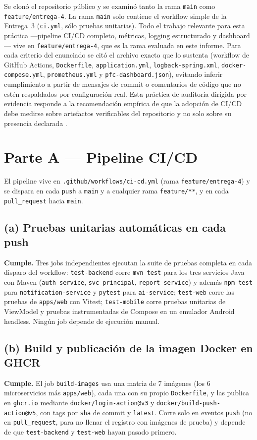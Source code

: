 \documentclass[11pt,letterpaper]{article}
\begin{document}
Se clonó el repositorio público y se examinó tanto la rama \texttt{main} como \texttt{feature/entrega-4}. La rama \texttt{main} solo contiene el workflow simple de la Entrega~3 (\texttt{ci.yml}, sólo pruebas unitarias). Todo el trabajo relevante para esta práctica —pipeline CI/CD completo, métricas, logging estructurado y dashboard— vive en \texttt{feature/entrega-4}, que es la rama evaluada en este informe. Para cada criterio del enunciado se citó el archivo exacto que lo sustenta (workflow de GitHub Actions, \texttt{Dockerfile}, \texttt{application.yml}, \texttt{logback-spring.xml}, \texttt{docker-compose.yml}, \texttt{prometheus.yml} y \texttt{pfc-dashboard.json}), evitando inferir cumplimiento a partir de mensajes de commit o comentarios de código que no estén respaldados por configuración real. Esta práctica de auditoría dirigida por evidencia responde a la recomendación empírica de que la adopción de CI/CD debe medirse sobre artefactos verificables del repositorio y no solo sobre su presencia declarada \cite{fairbanks2023cicd}.

\section{Parte A --- Pipeline CI/CD}

El pipeline vive en \texttt{.github/workflows/ci-cd.yml} (rama \texttt{feature/entrega-4}) y se dispara en cada \texttt{push} a \texttt{main} y a cualquier rama \texttt{feature/**}, y en cada \texttt{pull\_request} hacia \texttt{main}.

\subsection{(a) Pruebas unitarias automáticas en cada push}
\textbf{Cumple.} Tres jobs independientes ejecutan la suite de pruebas completa en cada disparo del workflow: \texttt{test-backend} corre \texttt{mvn test} para los tres servicios Java con Maven (\texttt{auth-service}, \texttt{svc-principal}, \texttt{report-service}) y además \texttt{npm test} para \texttt{notification-service} y \texttt{pytest} para \texttt{ai-service}; \texttt{test-web} corre las pruebas de \texttt{apps/web} con Vitest; \texttt{test-mobile} corre pruebas unitarias de ViewModel y pruebas instrumentadas de Compose en un emulador Android headless. Ningún job depende de ejecución manual.

\subsection{(b) Build y publicación de la imagen Docker en GHCR}
\textbf{Cumple.} El job \texttt{build-images} usa una matriz de 7 imágenes (los 6 microservicios más \texttt{apps/web}), cada una con su propio \texttt{Dockerfile}, y las publica en \texttt{ghcr.io} mediante \texttt{docker/login-action@v3} y \texttt{docker/build-push-action@v5}, con tags por \texttt{sha} de commit y \texttt{latest}. Corre solo en eventos \texttt{push} (no en \texttt{pull\_request}, para no llenar el registro con imágenes de prueba) y depende de que \texttt{test-backend} y \texttt{test-web} hayan pasado primero.
\end{document}
